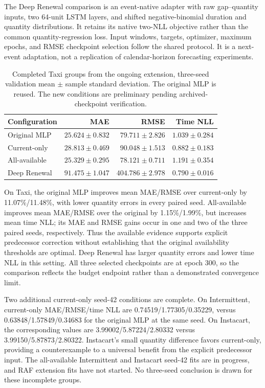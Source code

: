 \documentclass[runningheads]{llncs}
\begin{document}
The Deep Renewal comparison is an event-native adapter with raw gap--quantity
inputs, two 64-unit LSTM layers, and shifted negative-binomial duration and
quantity distributions. It retains its native two-NLL objective rather than
the common quantity-regression loss. Input windows, targets, optimizer,
maximum epochs, and RMSE checkpoint selection follow the shared protocol.
It is a next-event adaptation, not a replication of calendar-horizon
forecasting experiments.

\begin{table}[h]
\caption{Completed Taxi groups from the ongoing extension, three-seed
validation mean $\pm$ sample standard deviation. The original MLP is reused.
The new conditions are preliminary pending archived-checkpoint verification.}
\label{tab:extension}\centering\small
\begin{tabular}{lrrr}
\toprule
Configuration & MAE & RMSE & Time NLL\\
\midrule
Original MLP & $25.624\pm0.832$ & $79.711\pm2.826$ & $1.039\pm0.284$\\
Current-only & $28.813\pm0.469$ & $90.048\pm1.513$ & $0.882\pm0.183$\\
All-available & $25.329\pm0.295$ & $78.121\pm0.711$ & $1.191\pm0.354$\\
Deep Renewal & $91.475\pm1.047$ & $404.786\pm2.978$ & $0.790\pm0.016$\\
\bottomrule
\end{tabular}
\end{table}

On Taxi, the original MLP improves mean MAE/RMSE over current-only by
11.07\%/11.48\%, with lower quantity errors in every paired seed.
All-available improves mean MAE/RMSE over the original by 1.15\%/1.99\%,
but increases mean time NLL; its MAE and RMSE gains occur in one and two
of the three paired seeds, respectively. Thus the available evidence
supports explicit predecessor correction without establishing that the
original availability thresholds are optimal. Deep Renewal has larger
quantity errors and lower time NLL in this setting. All three selected
checkpoints are at epoch 300, so the comparison reflects the budget endpoint
rather than a demonstrated convergence limit.

Two additional current-only seed-42 conditions are complete. On Intermittent,
current-only MAE/RMSE/time NLL are 0.74519/1.77305/0.35229, versus
0.63848/1.57849/0.34683 for the original MLP at the same seed. On Instacart,
the corresponding values are 3.99002/5.87224/2.80332 versus
3.99150/5.87873/2.80322. Instacart's small quantity difference favors
current-only, providing a counterexample to a universal benefit from the
explicit predecessor input. The all-available Intermittent and Instacart
seed-42 fits are in progress, and RAF extension fits have not started.
No three-seed conclusion is drawn for these incomplete groups.
\end{document}
